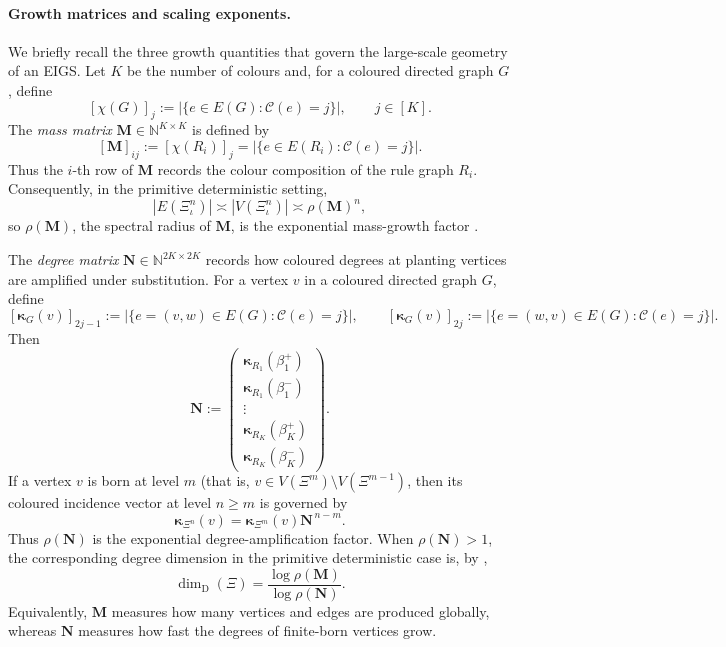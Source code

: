 \documentclass{article}
\theoremstyle{plain}
\theoremstyle{definition}
\newcommand{\dimdeg}{\dim_\mathrm{D}}
\begin{document}
\paragraph{Growth matrices and scaling exponents.}
We briefly recall the three growth quantities that govern the large-scale geometry of an EIGS.
Let \(K\) be the number of colours and, for a coloured directed graph \(G\), define
\[
    [\chi(G)]_j
    :=
    \bigl|\{e\in E(G): \mathscr C(e)=j\}\bigr|,
    \qquad j\in[K].
\]
The \emph{mass matrix} \(\mathbf M\in\mathbb N^{K\times K}\) is defined by
\[
    [\mathbf M]_{ij}
    :=
    [\chi(R_i)]_j
    =
    \bigl|\{e\in E(R_i): \mathscr C(e)=j\}\bigr|.
\]
Thus the \(i\)-th row of \(\mathbf M\) records the colour composition of the rule graph \(R_i\). 
Consequently, in the primitive deterministic setting,
\[
    |E(\Xi_\iota^n)| \asymp |V(\Xi_\iota^n)|
    \asymp \rho(\mathbf M)^n ,
\]
so \(\rho(\mathbf M)\), the spectral radius of $\mathbf M$, is the exponential mass-growth factor \cite{neroli2024fractal}.

The \emph{degree matrix} \(\mathbf N\in\mathbb N^{2K\times 2K}\) records how coloured degrees at planting vertices are amplified under substitution. For a vertex \(v\) in a coloured directed graph \(G\), define
\[
    [\boldsymbol \kappa_G(v)]_{2j-1}
    :=
    \bigl|\{e=(v,w)\in E(G): \mathscr C(e)=j\}\bigr|,
    \qquad
    [\boldsymbol \kappa_G(v)]_{2j}
    :=
    \bigl|\{e=(w,v)\in E(G): \mathscr C(e)=j\}\bigr|.
\]
Then
\[
    \mathbf N
    :=
    \begin{pmatrix}
        \boldsymbol \kappa_{R_1}(\beta_1^+)\\
        \boldsymbol \kappa_{R_1}(\beta_1^-)\\
        \vdots\\
        \boldsymbol \kappa_{R_K}(\beta_K^+)\\
        \boldsymbol \kappa_{R_K}(\beta_K^-)
    \end{pmatrix}.
\]
If a vertex \(v\) is born at level \(m\) (that is, \(v\in V(\Xi^m)\setminus V(\Xi^{m-1})\), then its coloured incidence vector at level \(n\ge m\) is governed by
\[
    \boldsymbol \kappa_{\Xi^n}(v)=\boldsymbol \kappa_{\Xi^m}(v)\mathbf N^{\,n-m}.
\]
Thus \(\rho(\mathbf N)\) is the exponential degree-amplification factor. When \(\rho(\mathbf N)>1\), the corresponding degree dimension in the primitive deterministic case is, by \cite{li2024on},
\[
    \dimdeg(\Xi)
    =
    \frac{\log \rho(\mathbf M)}{\log \rho(\mathbf N)}.
\]
Equivalently, \(\mathbf M\) measures how many vertices and edges are produced globally, whereas \(\mathbf N\) measures how fast the degrees of finite-born vertices grow.
\end{document}
